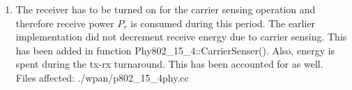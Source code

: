 \begin{enumerate}
\item{The receiver has to be turned on for the carrier sensing operation and therefore
receive power $P_r$ is consumed during this period. The earlier implementation did not
decrement receive energy due to carrier sensing. This has been added in function
\mbox{Phy802\_15\_4::CarrierSenser()}. Also, energy is spent during the tx-rx
turnaround. This has been accounted for as well.\\
Files affected:  ./wpan/p802\_15\_4phy.cc}

\end{enumerate}

\endinput
